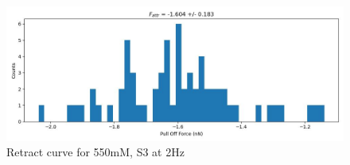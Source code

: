 \begin{figure}[h!]
\centering
\includegraphics[width=\textwidth]{chapter7/Tip speed/550mM/S3 2Hz/retract_f_a_hist.jpg}
\caption{Retract curve for 550mM, S3 at 2Hz}
\end{figure}
